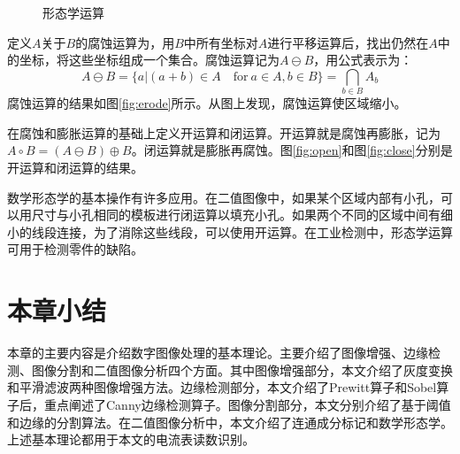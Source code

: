 \begin{figure}[h]
  \centering
  \hspace{1cm}
    \\
    \hspace{1cm}
    \\
  \hspace{1cm}
  \caption{形态学运算}
\end{figure}

定义$A$关于$B$的腐蚀运算为，用$B$中所有坐标对$A$进行平移运算后，找出仍然在$A$中的坐标，将这些坐标组成一个集合。腐蚀运算记为$A\ominus B$，用公式表示为：
\begin{equation}
  \label{eq:erode}
  A\ominus B=\{a|(a+b)\in A\quad\textrm{for}\ a\in A,b\in B\}=\bigcap_{b\in B}A_b
\end{equation}
腐蚀运算的结果如图\ref{fig:erode}所示。从图上发现，腐蚀运算使区域缩小。

在腐蚀和膨胀运算的基础上定义开运算和闭运算。开运算就是腐蚀再膨胀，记为$A\circ B=(A\ominus B)\oplus B$。闭运算就是膨胀再腐蚀。图\ref{fig:open}和图\ref{fig:close}分别是开运算和闭运算的结果。


数学形态学的基本操作有许多应用。在二值图像中，如果某个区域内部有小孔，可以用尺寸与小孔相同的模板进行闭运算以填充小孔。如果两个不同的区域中间有细小的线段连接，为了消除这些线段，可以使用开运算。在工业检测中，形态学运算可用于检测零件的缺陷。

\section{本章小结}

本章的主要内容是介绍数字图像处理的基本理论。主要介绍了图像增强、边缘检测、图像分割和二值图像分析四个方面。其中图像增强部分，本文介绍了灰度变换和平滑滤波两种图像增强方法。边缘检测部分，本文介绍了Prewitt算子和Sobel算子后，重点阐述了Canny边缘检测算子。图像分割部分，本文分别介绍了基于阈值和边缘的分割算法。在二值图像分析中，本文介绍了连通成分标记和数学形态学。上述基本理论都用于本文的电流表读数识别。
